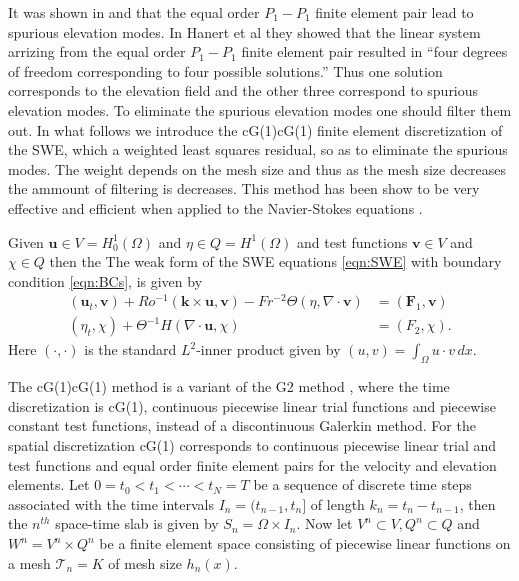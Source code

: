 It was shown in \cite{Hanert2002} and \cite{Le-Roux1998} that the equal order
$P_1-P_1$ finite element pair lead to spurious elevation modes. In Hanert et al
\cite{Hanert2002} they showed that the linear system arrizing from the equal
order $P_1-P_1$ finite element pair resulted in ``four degrees of freedom
corresponding to four possible solutions.'' Thus one solution corresponds to the
elevation field and the other three correspond to spurious elevation modes. To
eliminate the spurious elevation modes one should filter them out. In what
follows we introduce the cG(1)cG(1) finite element discretization of the SWE,
which a weighted least squares residual, so as to eliminate the spurious modes.
The weight depends on the mesh size and thus as the mesh size decreases the
ammount of filtering is decreases. This method has been show to be very
effective and efficient when applied to the Navier-Stokes equations
\cite{Hoffman2003,Hoffman2006a,Hoffman2006b,Hoffman2011,Jansson2011}.

Given $\mathbf{u} \in V=H^1_0(\Omega)$ and $\eta \in Q=H^1(\Omega)$ and
test functions $\mathbf{v} \in V$ and $\chi \in Q$ then the The weak form of the
SWE equations \eqref{eqn:SWE} with boundary condition \eqref{eqn:BCs}, is given
by
\begin{equation}
  \begin{split}
    (\mathbf{u}_t, \mathbf{v}) + Ro^{-1}(\mathbf{k} \times
    \mathbf{u}, \mathbf{v}) - Fr^{-2} \Theta (\eta, \nabla\cdot \mathbf{v}) 
        &= (\mathbf{F}_1,\mathbf{v})\\
        (\eta_t, \chi) + \Theta^{-1} H (\nabla\cdot \mathbf{u},\chi) &= (F_2,\chi).
  \end{split}
  \label{eqn:WeakSWE}
\end{equation}
Here $(\cdot, \cdot)$ is the standard $L^2$-inner product given by $(u,v) =
\int_{\Omega}\! u\cdot v\, dx$.

The cG(1)cG(1) method is a variant of the G2 method \cite{Johnson1998}, where
the time discretization is cG(1), continuous piecewise linear trial functions
and piecewise constant test functions, instead of a discontinuous Galerkin
method. For the spatial discretization cG(1) corresponds to continuous piecewise
linear trial and test functions and equal order finite element pairs for the
velocity and elevation elements. Let $0 = t_0 < t_1 < \cdots < t_N = T$ be a
sequence of discrete time steps associated with the time intervals $I_n =
(t_{n-1},t_n]$ of length $k_n = t_n - t_{n-1}$, then the $n^{th}$
space-time slab is given by $S_n = \Omega \times I_n$. Now let $V^n \subset V,
Q^n \subset Q$ and $W^n = V^n \times Q^n$ be a finite element space consisting
of piecewise linear functions on a mesh $\mathcal{T}_n = {K}$ of mesh size
$h_n(x)$.

